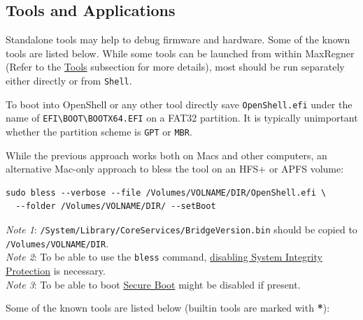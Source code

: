 \documentclass[]{article}
\makeatletter
\renewcommand{\label}[1]{%
\zref@wrapper@immediate{\oldlabel{#1}}}  %
\makeatother
\begin{document}
\subsection{Tools and Applications}\label{uefitools}

Standalone tools may help to debug firmware and hardware. Some of the known tools are listed below.
While some tools can be launched from within MaxRegner (Refer to the \hyperref[misctools]{Tools} subsection
for more details), most should be run separately either directly or from \texttt{Shell}.

To boot into OpenShell or any other tool directly save \texttt{OpenShell.efi}
under the name of \texttt{EFI\textbackslash BOOT\textbackslash BOOTX64.EFI}
on a FAT32 partition. It is typically unimportant whether the partition scheme
is \texttt{GPT} or \texttt{MBR}.

While the previous approach works both on Macs and other computers,
an alternative Mac-only approach to bless the tool on an HFS+ or APFS
volume:

\begin{lstlisting}[caption=Blessing tool, label=blesstool, style=ocbash]
sudo bless --verbose --file /Volumes/VOLNAME/DIR/OpenShell.efi \
  --folder /Volumes/VOLNAME/DIR/ --setBoot
\end{lstlisting}

\emph{Note 1}: \texttt{/System/Library/CoreServices/BridgeVersion.bin} should be copied
  to \texttt{/Volumes/VOLNAME/DIR}. \\
\emph{Note 2}: To be able to use the \texttt{bless} command,
  \href{https://developer.apple.com/library/archive/documentation/Security/Conceptual/System_Integrity_Protection_Guide/ConfiguringSystemIntegrityProtection/ConfiguringSystemIntegrityProtection.html}{disabling System Integrity Protection} is necessary. \\
\emph{Note 3}: To be able to boot \href{https://support.apple.com/HT208330}{Secure Boot}
  might be disabled if present.

Some of the known tools are listed below (builtin tools are marked with \textbf{*}):
\end{document}
